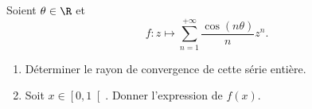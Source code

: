 \begin{enonce}
\begin{exercise}[ID={RMS128 E703},subtitle={Mines-Ponts PSI 2017},tags={}]
Soient $\theta\in\R$ et
\begin{equation*}
  f: z\mapsto \sum_{n=1}^{+\infty} \frac{\cos(n\theta)}{n} z^n.
\end{equation*}
\begin{enumerate}
  \item Déterminer le rayon de convergence de cette série entière.
  \item Soit $x\in\left[0,1\right[$. Donner l'expression de $f(x)$.
\end{enumerate}
\end{exercise}
\begin{solution}
\end{solution}
\end{enonce}
